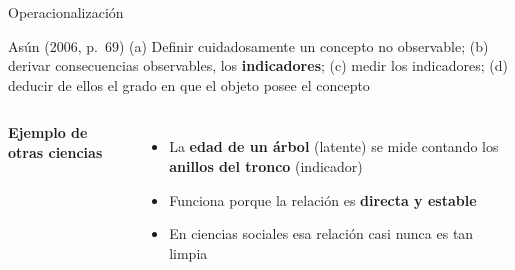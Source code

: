 \documentclass[aspectratio=169,11pt]{beamer}
\newcommand{\hl}[1]{\textcolor{marino}{\textbf{#1}}}        %
\begin{document}
\begin{frame}{Operacionalización}
\begin{block}{Asún (2006, p.~69)}
\small
(a) Definir cuidadosamente un concepto no observable; (b) derivar consecuencias observables, los \hl{indicadores}; (c) medir los indicadores; (d) deducir de ellos el grado en que el objeto posee el concepto
\end{block}
\bigskip
\begin{columns}[c]
\textbf{Ejemplo de otras ciencias}
\begin{itemize}
  \item La \textbf{edad de un árbol} (latente) se mide contando los \textbf{anillos del tronco} (indicador)
  \item Funciona porque la relación es \textbf{directa y estable}
  \item En ciencias sociales esa relación casi nunca es tan limpia
\end{itemize}
\centering
{}
\end{columns}
\end{frame}
\end{document}
